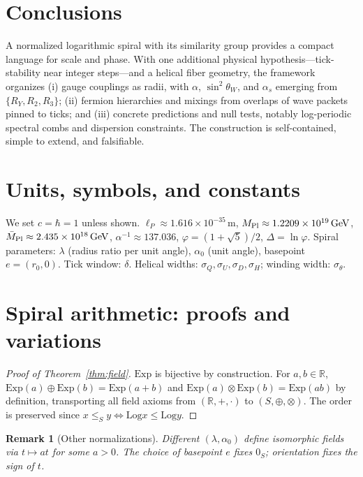 \documentclass[11pt]{article}
\newtheorem{remark}{Remark}
\newcommand{\R}{\mathbb{R}}
\newcommand{\Exp}{\mathrm{Exp}}
\newcommand{\Log}{\mathrm{Log}}
\begin{document}
\section{Conclusions}
A normalized logarithmic spiral with its similarity group provides a compact language for scale and phase.
With one additional physical hypothesis---tick-stability near integer steps---and a helical fiber geometry, the framework organizes
(i) gauge couplings as radii, with \(\alpha\), \(\sin^2\theta_W\), and \(\alpha_s\) emerging from \(\{R_Y,R_2,R_3\}\);
(ii) fermion hierarchies and mixings from overlaps of wave packets pinned to ticks;
and (iii) concrete predictions and null tests, notably log-periodic spectral combs and dispersion constraints.
The construction is self-contained, simple to extend, and falsifiable.

\appendix

\section{Units, symbols, and constants}
We set \(c=\hbar=1\) unless shown.
\(\ell_P\approx 1.616\times 10^{-35}\,\mathrm{m}\), \(M_{\rm Pl}\approx 1.2209\times 10^{19}\,\mathrm{GeV}\), \(\bar M_{\rm Pl}\approx 2.435\times 10^{18}\,\mathrm{GeV}\), \(\alpha^{-1}\approx 137.036\), \(\varphi=(1+\sqrt{5})/2\), \(\Delta=\ln\varphi\).
Spiral parameters: \(\lambda\) (radius ratio per unit angle), \(\alpha_0\) (unit angle), basepoint \(e=(r_0,0)\). Tick window: \(\delta\). Helical widths: \(\sigma_Q,\sigma_U,\sigma_D,\sigma_H\); winding width: \(\sigma_\theta\).

\section{Spiral arithmetic: proofs and variations}
\begin{proof}[Proof of Theorem~\ref{thm:field}]
\(\Exp\) is bijective by construction. For \(a,b\in\R\),
\(\Exp(a)\oplus \Exp(b)=\Exp(a+b)\) and \(\Exp(a)\otimes \Exp(b)=\Exp(ab)\) by definition, transporting all field axioms from \((\R,+,\cdot)\) to \((S,\oplus,\otimes)\). The order is preserved since \(x\le_S y\iff \Log x\le \Log y\). \qedhere
\end{proof}
\begin{remark}[Other normalizations]
Different \((\lambda,\alpha_0)\) define isomorphic fields via \(t\mapsto at\) for some \(a>0\).
The choice of basepoint \(e\) fixes \(0_S\); orientation fixes the sign of \(t\).
\end{remark}
\end{document}
